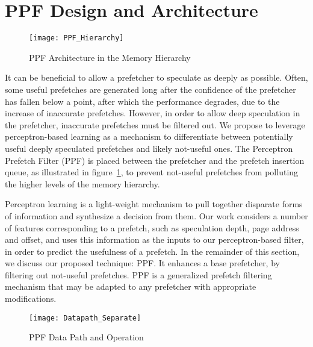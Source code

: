 \section{PPF Design and Architecture}
\label{Arch}

\begin{figure}
  \begin{center}
  \texttt{[image: PPF\_Hierarchy]}
  \caption{PPF Architecture in the Memory Hierarchy}
  \label{fig:PPF_Hierarchy}
  \end{center}
\end{figure}

It can be beneficial to allow a prefetcher to speculate as deeply as
possible. Often, some useful prefetches are generated long after the
confidence of the prefetcher has fallen below a point, after which the
performance degrades, due to the increase of inaccurate prefetches. However,
in order to allow deep speculation in the prefetcher, inaccurate prefetches
must be filtered out. We propose to leverage perceptron-based learning as a
mechanism to differentiate between potentially useful deeply speculated
prefetches and likely not-useful ones. The Perceptron Prefetch Filter (PPF) is
placed between the prefetcher and the prefetch insertion queue, as illustrated
in figure~\ref{fig:PPF_Hierarchy}, to prevent not-useful prefetches from
polluting the higher levels of the memory hierarchy.

Perceptron learning is a light-weight mechanism to pull together disparate
forms of information and synthesize a decision from them. Our work considers
a number of features corresponding to a prefetch, such as speculation depth,
page address and offset, and uses this information as the inputs to our
perceptron-based filter, in order to predict the usefulness of a prefetch. In
the remainder of this section, we discuss our proposed technique: PPF. It
enhances a base prefetcher, by filtering out not-useful prefetches. PPF is a
generalized prefetch filtering mechanism that may be adapted to any prefetcher
with appropriate modifications.

\begin{figure}[ht]
  \begin{center}
  \texttt{[image: Datapath\_Separate]}
  \caption{PPF Data Path and Operation}
  \label{fig:PPF_Datapath}
  \end{center}
\end{figure}

